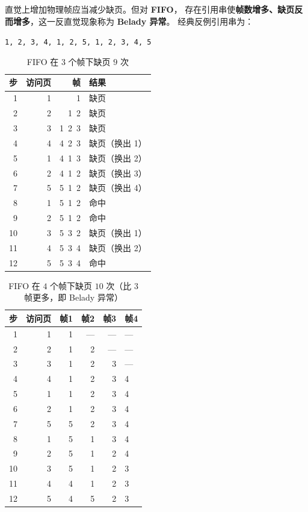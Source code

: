 直觉上增加物理帧应当减少缺页。但对 \textbf{FIFO}，
存在引用串使\textbf{帧数增多、缺页反而增多}，这一反直觉现象称为 \textbf{Belady 异常}。
经典反例引用串为：

\begin{center}
\texttt{1, 2, 3, 4, 1, 2, 5, 1, 2, 3, 4, 5}
\end{center}

\begin{table}[H]
\centering
\caption{FIFO 在 $3$ 个帧下缺页 $9$ 次}
\begin{tabular}{rrrl}
\toprule
步 & 访问页 & 帧 & 结果 \\
\midrule
 1 & 1 & 1 & 缺页 \\
 2 & 2 & 1\ 2 & 缺页 \\
 3 & 3 & 1\ 2\ 3 & 缺页 \\
 4 & 4 & 4\ 2\ 3 & 缺页（换出 1） \\
 5 & 1 & 4\ 1\ 3 & 缺页（换出 2） \\
 6 & 2 & 4\ 1\ 2 & 缺页（换出 3） \\
 7 & 5 & 5\ 1\ 2 & 缺页（换出 4） \\
 8 & 1 & 5\ 1\ 2 & 命中 \\
 9 & 2 & 5\ 1\ 2 & 命中 \\
10 & 3 & 5\ 3\ 2 & 缺页（换出 1） \\
11 & 4 & 5\ 3\ 4 & 缺页（换出 2） \\
12 & 5 & 5\ 3\ 4 & 命中 \\
\bottomrule
\end{tabular}
\end{table}

\begin{table}[H]
\centering
\caption{FIFO 在 $4$ 个帧下缺页 $10$ 次（比 $3$ 帧更多，即 Belady 异常）}
\begin{tabular}{rrrrrl}
\toprule
步 & 访问页 & 帧1 & 帧2 & 帧3 & 帧4 \\
\midrule
 1 & 1 & 1 & — & — & — \\
 2 & 2 & 1 & 2 & — & — \\
 3 & 3 & 1 & 2 & 3 & — \\
 4 & 4 & 1 & 2 & 3 & 4 \\
 5 & 1 & 1 & 2 & 3 & 4 \\
 6 & 2 & 1 & 2 & 3 & 4 \\
 7 & 5 & 5 & 2 & 3 & 4 \\
 8 & 1 & 5 & 1 & 3 & 4 \\
 9 & 2 & 5 & 1 & 2 & 4 \\
10 & 3 & 5 & 1 & 2 & 3 \\
11 & 4 & 4 & 1 & 2 & 3 \\
12 & 5 & 4 & 5 & 2 & 3 \\
\bottomrule
\end{tabular}
\end{table}

